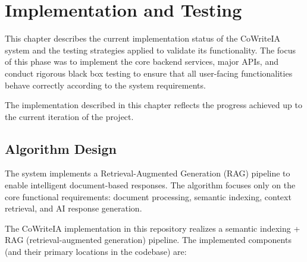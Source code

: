 \chapter{Implementation and Testing}
\label{ch:implementation-testing}
\sloppy
\setlength{\emergencystretch}{3em}

This chapter describes the current implementation status of the CoWriteIA system and the testing strategies applied to validate its functionality. The focus of this phase was to implement the core backend services, major APIs, and conduct rigorous black box testing to ensure that all user-facing functionalities behave correctly according to the system requirements.

The implementation described in this chapter reflects the progress achieved up to the current iteration of the project.

\section{Algorithm Design}
\label{sec:algorithm-design}

The system implements a Retrieval-Augmented Generation (RAG) pipeline to enable intelligent document-based responses. The algorithm focuses only on the core functional requirements: document processing, semantic indexing, context retrieval, and AI response generation.

The CoWriteIA implementation in this repository realizes a semantic indexing + RAG (retrieval-augmented generation) pipeline. The implemented components (and their primary locations in the codebase) are:

